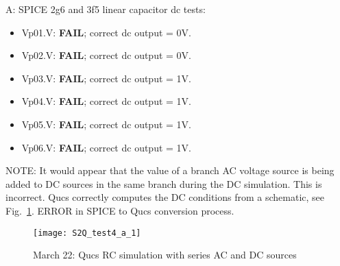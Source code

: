  \begin{flushleft} 


A: SPICE 2g6 and 3f5 linear capacitor dc tests:

\begin{itemize}
 \item Vp01.V: \textbf{FAIL}; correct dc output = 0V.
 \item Vp02.V: \textbf{FAIL}; correct dc output = 0V.
 \item Vp03.V: \textbf{FAIL}; correct dc output = 1V.
 \item Vp04.V: \textbf{FAIL}; correct dc output = 1V.
 \item Vp05.V: \textbf{FAIL}; correct dc output = 1V.
 \item Vp06.V: \textbf{FAIL}; correct dc output = 1V.
 \end{itemize}


NOTE: It would appear that the value of a branch AC voltage source is being added to DC sources in the same branch during the DC simulation. This is incorrect. Qucs correctly computes the DC conditions from a schematic, see Fig.~\ref{fig:S2Qtest4_2}.   ERROR in SPICE to Qucs conversion process.
 
\end{flushleft} 

\begin{figure}
  \centering
  \texttt{[image: S2Q\_test4\_a\_1]}
  \caption{March 22: Qucs RC simulation with series AC and DC sources}
  \label{fig:S2Qtest4_2}
\end{figure} 

